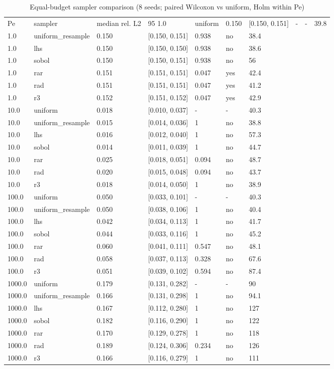 \begin{table}[t]\centering\small\caption{Equal-budget sampler comparison (8 seeds; paired Wilcoxon vs uniform, Holm within Pe)}\label{tab:phase3}
\begin{tabular}{lllllll}\toprule
Pe & sampler & median rel. L2 & 95%
1.0 & uniform & 0.150 & [0.150, 0.151] & - & - & 39.8 \\
1.0 & uniform\_resample & 0.150 & [0.150, 0.151] & 0.938 & no & 38.4 \\
1.0 & lhs & 0.150 & [0.150, 0.150] & 0.938 & no & 38.6 \\
1.0 & sobol & 0.150 & [0.150, 0.151] & 0.938 & no & 56 \\
1.0 & rar & 0.151 & [0.151, 0.151] & 0.047 & yes & 42.4 \\
1.0 & rad & 0.151 & [0.151, 0.151] & 0.047 & yes & 41.2 \\
1.0 & r3 & 0.152 & [0.151, 0.152] & 0.047 & yes & 42.9 \\
10.0 & uniform & 0.018 & [0.010, 0.037] & - & - & 40.3 \\
10.0 & uniform\_resample & 0.015 & [0.014, 0.036] & 1 & no & 38.8 \\
10.0 & lhs & 0.016 & [0.012, 0.040] & 1 & no & 57.3 \\
10.0 & sobol & 0.014 & [0.011, 0.039] & 1 & no & 44.7 \\
10.0 & rar & 0.025 & [0.018, 0.051] & 0.094 & no & 48.7 \\
10.0 & rad & 0.020 & [0.015, 0.048] & 0.094 & no & 43.7 \\
10.0 & r3 & 0.018 & [0.014, 0.050] & 1 & no & 38.9 \\
100.0 & uniform & 0.050 & [0.033, 0.101] & - & - & 40.3 \\
100.0 & uniform\_resample & 0.050 & [0.038, 0.106] & 1 & no & 40.4 \\
100.0 & lhs & 0.042 & [0.034, 0.113] & 1 & no & 41.7 \\
100.0 & sobol & 0.044 & [0.033, 0.116] & 1 & no & 45.2 \\
100.0 & rar & 0.060 & [0.041, 0.111] & 0.547 & no & 48.1 \\
100.0 & rad & 0.058 & [0.037, 0.113] & 0.328 & no & 67.6 \\
100.0 & r3 & 0.051 & [0.039, 0.102] & 0.594 & no & 87.4 \\
1000.0 & uniform & 0.179 & [0.131, 0.282] & - & - & 90 \\
1000.0 & uniform\_resample & 0.166 & [0.131, 0.298] & 1 & no & 94.1 \\
1000.0 & lhs & 0.167 & [0.112, 0.280] & 1 & no & 127 \\
1000.0 & sobol & 0.182 & [0.116, 0.290] & 1 & no & 122 \\
1000.0 & rar & 0.170 & [0.129, 0.278] & 1 & no & 118 \\
1000.0 & rad & 0.189 & [0.124, 0.306] & 0.234 & no & 126 \\
1000.0 & r3 & 0.166 & [0.116, 0.279] & 1 & no & 111 \\
\bottomrule\end{tabular}\end{table}
